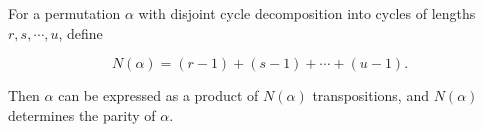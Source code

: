 For a permutation $\alpha$ with disjoint cycle decomposition into cycles of lengths $r, s, \cdots, u$, define

$$N(\alpha) = (r - 1) + (s - 1) + \cdots + (u - 1).$$

Then $\alpha$ can be expressed as a product of $N(\alpha)$ transpositions, and $N(\alpha)$ determines the parity of $\alpha$.
